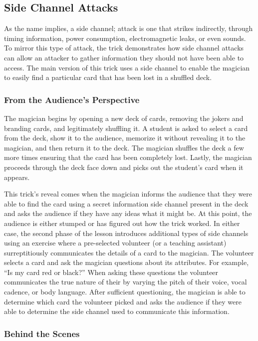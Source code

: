 \subsection{Side Channel Attacks}

As the name implies, a side channel; attack is one that strikes indirectly,
through timing information, power consumption, electromagnetic leaks, or even
sounds.  To mirror this type of attack, the trick
demonstrates how side channel attacks can allow an attacker to
gather information they should not have been able to access.
The main version of this trick uses a side channel to
enable the magician to easily
find a particular card that has been lost in a shuffled deck.

\subsubsection{From the Audience's Perspective}

The magician begins by opening a new deck of cards, removing the jokers and
branding cards, and legitimately shuffling it.  A student is asked to
select a card from the deck, show it to the audience, memorize it without
revealing it to the magician, and then return it to the deck.
The magician shuffles the deck a few more times ensuring that the card has
been completely lost.
Lastly, the magician proceeds through the deck face down and picks out the
student's card when it appears.

This trick's reveal comes when the magician informs the audience that they were
able to find the card using a secret information side channel present in the
deck and asks the audience if they have any ideas what it might be.
At this point, the audience is either stumped or has figured out how the trick
worked.  In either case,  the second phase of the lesson
introduces additional types of side channels
using an
exercise where a pre-selected volunteer (or a teaching assistant)
surreptitiously
communicates the details of a card
to the magician.
The volunteer selects a card and ask the magician questions about its
attributes.
For example, ``Is my card red or black?''
When asking these questions the volunteer communicates the true nature of their
by varying the pitch of their voice, vocal cadence, or body language.
After sufficient questioning, the magician is able to determine which card the
volunteer picked and asks the audience if they were able to determine the side
channel used to communicate this information.

\subsubsection{Behind the Scenes}

